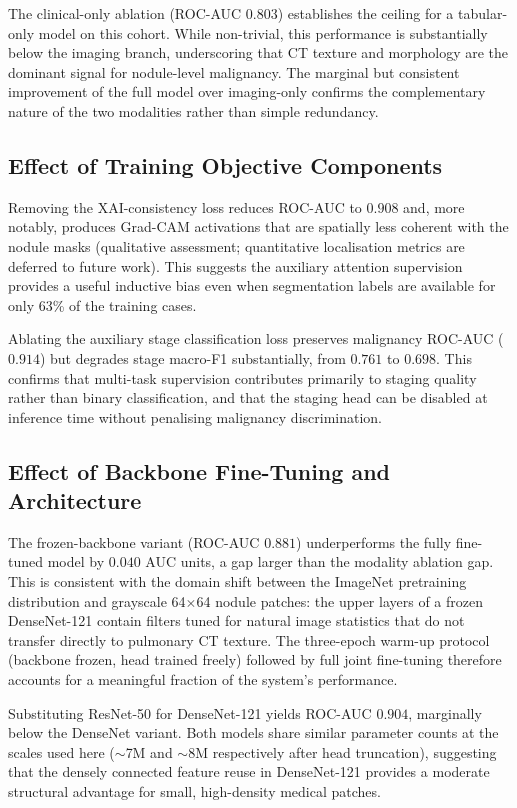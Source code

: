 {The clinical-only ablation (ROC-AUC $0.803$) establishes the ceiling for a tabular-only
model on this cohort. While non-trivial, this performance is substantially below the
imaging branch, underscoring that CT texture and morphology are the dominant signal
for nodule-level malignancy. The marginal but consistent improvement of the full model
over imaging-only confirms the complementary nature of the two modalities rather than
simple redundancy.

\subsection{Effect of Training Objective Components}

Removing the XAI-consistency loss reduces ROC-AUC to $0.908$ and, more notably,
produces Grad-CAM activations that are spatially less coherent with the nodule masks
(qualitative assessment; quantitative localisation metrics are deferred to future work).
This suggests the auxiliary attention supervision provides a useful inductive bias even
when segmentation labels are available for only 63\% of the training cases.

Ablating the auxiliary stage classification loss preserves malignancy ROC-AUC
($0.914$) but degrades stage macro-F1 substantially, from $0.761$ to $0.698$. This
confirms that multi-task supervision contributes primarily to staging quality rather
than binary classification, and that the staging head can be disabled at inference time
without penalising malignancy discrimination.

\subsection{Effect of Backbone Fine-Tuning and Architecture}

The frozen-backbone variant (ROC-AUC $0.881$) underperforms the fully fine-tuned
model by $0.040$ AUC units, a gap larger than the modality ablation gap. This is
consistent with the domain shift between the ImageNet pretraining distribution and
grayscale 64$\times$64 nodule patches: the upper layers of a frozen DenseNet-121
contain filters tuned for natural image statistics that do not transfer directly to
pulmonary CT texture. The three-epoch warm-up protocol (backbone frozen, head trained
freely) followed by full joint fine-tuning therefore accounts for a meaningful fraction
of the system's performance.

Substituting ResNet-50 for DenseNet-121 yields ROC-AUC $0.904$, marginally below the
DenseNet variant. Both models share similar parameter counts at the scales used here
($\sim$7M and $\sim$8M respectively after head truncation), suggesting that the
densely connected feature reuse in DenseNet-121 provides a moderate structural
advantage for small, high-density medical patches.

}
